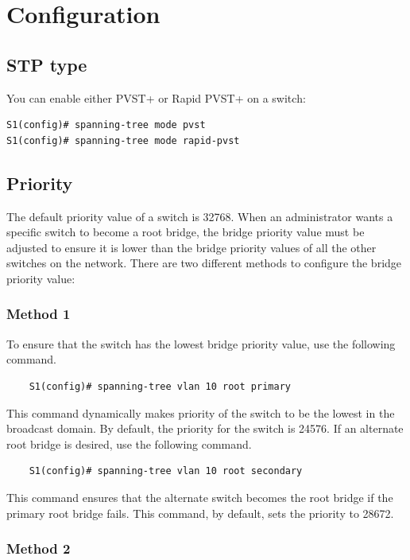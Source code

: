 \section{Configuration}

\subsection{STP type}

You can enable either PVST+ or Rapid PVST+ on a switch:

\begin{verbatim}
S1(config)# spanning-tree mode pvst
S1(config)# spanning-tree mode rapid-pvst
\end{verbatim}

\subsection{Priority}

The default priority value of a switch is 32768. When an administrator wants a specific switch to become a root bridge, the bridge priority value must be adjusted to ensure it is lower than the bridge priority values of all the other switches on the network. There are two different methods to configure the bridge priority value:

\subsubsection{Method 1}

To ensure that the switch has the lowest bridge priority value, use the following command.
    \begin{verbatim}
    S1(config)# spanning-tree vlan 10 root primary
    \end{verbatim}
This command dynamically makes priority of the switch to be the lowest in the broadcast domain. By default, the priority for the switch is 24576. If an alternate root bridge is desired, use the following command. 
    \begin{verbatim}
    S1(config)# spanning-tree vlan 10 root secondary
    \end{verbatim}   
This command ensures that the alternate switch becomes the root bridge if the primary root bridge fails.  This command, by default, sets the priority to 28672.

\subsubsection{Method 2}

